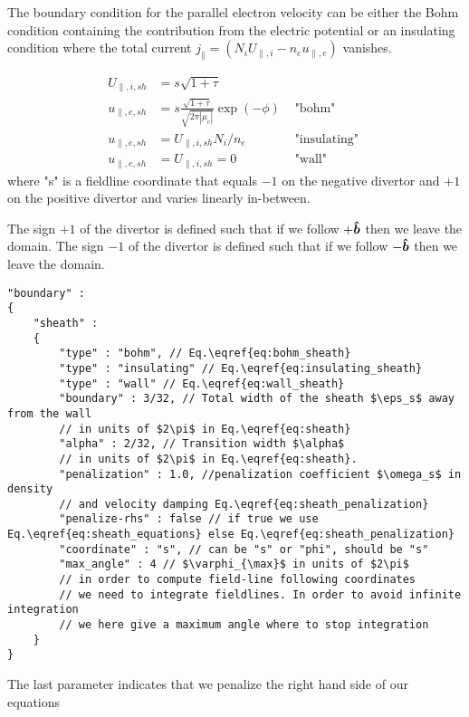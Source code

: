 The boundary condition for the parallel electron velocity can be either the Bohm condition containing the contribution from the electric potential or
an insulating condition where the total current $j_\parallel =  (N_i U_{\parallel,i} - n_e u_{\parallel,e})$ vanishes.

\begin{align}
    U_{\parallel,i, sh} &= s\sqrt{1+\tau} \\
    u_{\parallel,e, sh} &= s\frac{\sqrt{1+\tau}}{\sqrt{2\pi|\mu_e|}}\exp(-\phi) &\text{ "bohm" } \label{eq:bohm_sheath}\\
    u_{\parallel,e, sh} &= U_{\parallel,i,sh}N_i/n_e &\text{ "insulating" } \label{eq:insulating_sheath} \\
    u_{\parallel,e, sh} &= U_{\parallel,i,sh} = 0 &\text{ "wall" } \label{eq:wall_sheath}
\end{align}
where "s" is a fieldline coordinate that equals $-1$ on the negative divertor and $+1$ on the positive divertor
and varies linearly in-between.
\begin{tcolorbox}[title=Note]
    The sign $+1$ of the divertor is defined such that if we follow $+\bm{\hat{b}}$
    then we leave the domain.
    The sign $-1$ of the divertor is defined such that if we follow $-\bm{\hat{b}}$
    then we leave the domain.
\end{tcolorbox}
\begin{verbatim}
"boundary" :
{
    "sheath" :
    {
        "type" : "bohm", // Eq.\eqref{eq:bohm_sheath}
        "type" : "insulating" // Eq.\eqref{eq:insulating_sheath}
        "type" : "wall" // Eq.\eqref{eq:wall_sheath}
        "boundary" : 3/32, // Total width of the sheath $\eps_s$ away from the wall
        // in units of $2\pi$ in Eq.\eqref{eq:sheath}
        "alpha" : 2/32, // Transition width $\alpha$
        // in units of $2\pi$ in Eq.\eqref{eq:sheath}.
        "penalization" : 1.0, //penalization coefficient $\omega_s$ in density
        // and velocity damping Eq.\eqref{eq:sheath_penalization}
        "penalize-rhs" : false // if true we use Eq.\eqref{eq:sheath_equations} else Eq.\eqref{eq:sheath_penalization}
        "coordinate" : "s", // can be "s" or "phi", should be "s"
        "max_angle" : 4 // $\varphi_{\max}$ in units of $2\pi$
        // in order to compute field-line following coordinates
        // we need to integrate fieldlines. In order to avoid infinite integration
        // we here give a maximum angle where to stop integration
    }
}
\end{verbatim}
\noindent
The last parameter indicates that we penalize the right hand side of our equations
